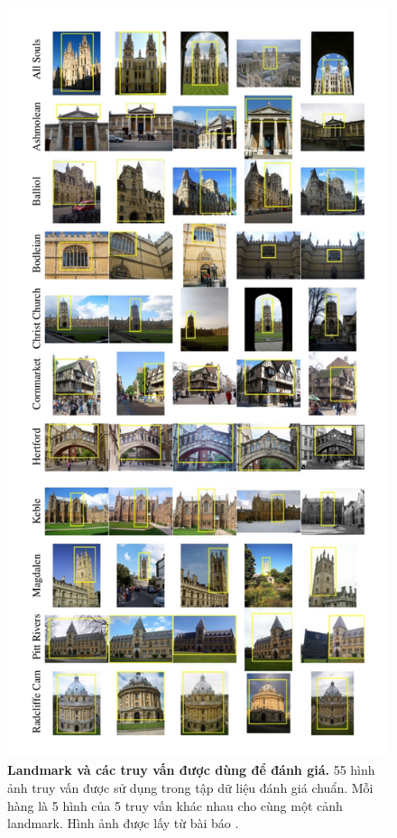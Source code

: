 \begin{figure}[!htbp]
\begin{center}
    \else
      \includegraphics[scale=0.27]{oxfordDataset}
    \fi
    \caption[Landmark và các truy vấn được dùng để đánh giá]{\textbf{Landmark và các truy vấn được dùng để đánh giá.} 55 hình ảnh truy vấn được sử dụng trong tập dữ liệu đánh giá chuẩn. Mỗi hàng là 5 hình của 5 truy vấn khác nhau cho cùng một cảnh landmark. Hình ảnh được lấy từ bài báo \cite{philbin2007object}.}
    \label{FigOxfordDataset}
  \end{center}
\end{figure}


